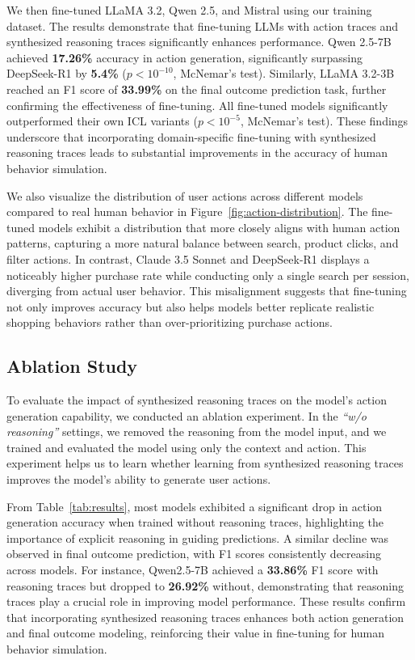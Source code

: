 \documentclass[11pt]{article}
\begin{document}
We then fine-tuned LLaMA 3.2, Qwen 2.5, and Mistral using our training dataset. The results demonstrate that fine-tuning LLMs with action traces and synthesized reasoning traces significantly enhances performance. Qwen 2.5-7B achieved \textbf{17.26\%} accuracy in action generation, significantly surpassing DeepSeek-R1 by \textbf{5.4\%} {($p < 10^{-10}$, McNemar's test)}. Similarly, LLaMA 3.2-3B reached an F1 score of \textbf{33.99\%} on the final outcome prediction task, further confirming the effectiveness of fine-tuning.
{All fine-tuned models significantly outperformed their own ICL variants ($p < 10^{-5}$, McNemar's test).}
These findings underscore that incorporating domain-specific fine-tuning with synthesized reasoning traces leads to substantial improvements in the accuracy of human behavior simulation.

We also visualize the distribution of user actions across different models compared to real human behavior in Figure~\ref{fig:action-distribution}.
The fine-tuned models exhibit a distribution that more closely aligns with human action patterns, capturing a more natural balance between search, product clicks, and filter actions. In contrast, Claude 3.5 Sonnet and DeepSeek-R1 displays a noticeably higher purchase rate while conducting only a single search per session, diverging from actual user behavior. This misalignment suggests that fine-tuning not only improves accuracy but also helps models better replicate realistic shopping behaviors rather than over-prioritizing purchase actions.



\subsection{Ablation Study}  

To evaluate the impact of synthesized reasoning traces on the model's action generation capability, we conducted an ablation experiment.  In the \textit{``w/o reasoning''} settings, we removed the reasoning from the model input, and we trained and evaluated the model using only the context and action. This experiment helps us to learn whether learning from synthesized reasoning traces improves the model’s ability to generate user actions.



From Table~\ref{tab:results}, most models exhibited a significant drop in action generation accuracy when trained without reasoning traces, highlighting the importance of explicit reasoning in guiding predictions. A similar decline was observed in final outcome prediction, with F1 scores consistently decreasing across models.
For instance, Qwen2.5-7B achieved a \textbf{33.86\%} F1 score with reasoning traces but dropped to \textbf{26.92\%} without, demonstrating that reasoning traces play a crucial role in improving model performance.
These results confirm that incorporating synthesized reasoning traces enhances both action generation and final outcome modeling, reinforcing their value in fine-tuning for human behavior simulation.
\end{document}
